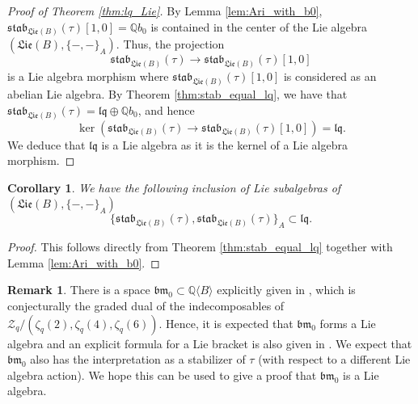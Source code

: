 \documentclass[11pt, a4paper]{amsart}
\newtheorem{corollary}[theorem]{Corollary}
\numberwithin{equation}{section}
\theoremstyle{definition}
\newtheorem{remark}[theorem]{Remark}
\newcommand{\Q}{\mathbb{Q}}
\newcommand{\qMZV}{\mathcal{Z}_q}
\newcommand{\QB}{\Q\langle B\rangle}
\newcommand{\lqq}{\mathfrak{lq}}
\newcommand{\Lie}{\mathfrak{Lie}}
\newcommand{\stab}{\mathfrak{stab}}
\begin{document}



\begin{proof}[Proof of Theorem \ref{thm:lq_Lie}] By Lemma \ref{lem:Ari_with_b0}, $\stab_{\Lie(B)}(\tau)[1,0]=\Q b_0$ is contained in the center of the Lie algebra $(\Lie(B),\{-,-\}_A)$. Thus, the projection
\[
\stab_{\Lie(B)}(\tau)\to\stab_{\Lie(B)}(\tau)[1,0]
\]
is a Lie algebra morphism where $\stab_{\Lie(B)}(\tau)[1,0]$ is considered as an abelian Lie algebra. By Theorem \ref{thm:stab_equal_lq}, we have that $\stab_{\Lie(B)}(\tau)=\lqq \oplus \Q b_0$, and hence 
\[
\ker(\stab_{\Lie(B)}(\tau)\to\stab_{\Lie(B)}(\tau)[1,0])=\lqq.
\]
We deduce that $\lqq$ is a Lie algebra as it is the kernel of a Lie algebra morphism. 
\end{proof}

\begin{corollary} We have the following inclusion of Lie subalgebras of $(\Lie(B),\{-,-\}_A)$
\[
\{\stab_{\Lie(B)}(\tau),\stab_{\Lie(B)}(\tau)\}_A\subset \lqq.
\]
\end{corollary}

\begin{proof} This follows directly from Theorem \ref{thm:stab_equal_lq} together with Lemma \ref{lem:Ari_with_b0}.
\end{proof}

\begin{remark}
There is a space $\mathfrak{bm}_0 \subset \QB$ explicitly given in \cite{Bu23}, which is conjecturally the graded dual of the indecomposables of $\qMZV/(\zeta_q(2),\zeta_q(4),\zeta_q(6))$. Hence, it is expected that $\mathfrak{bm}_0$ forms a Lie algebra and an explicit formula for a Lie bracket is also given in \cite{Bu23}. We expect that $\mathfrak{bm}_0$ also has the interpretation as a stabilizer of $\tau$ (with respect to a different Lie algebra action). We hope this can be used to give a proof that $\mathfrak{bm}_0$ is a Lie algebra.
\end{remark}
\end{document}
